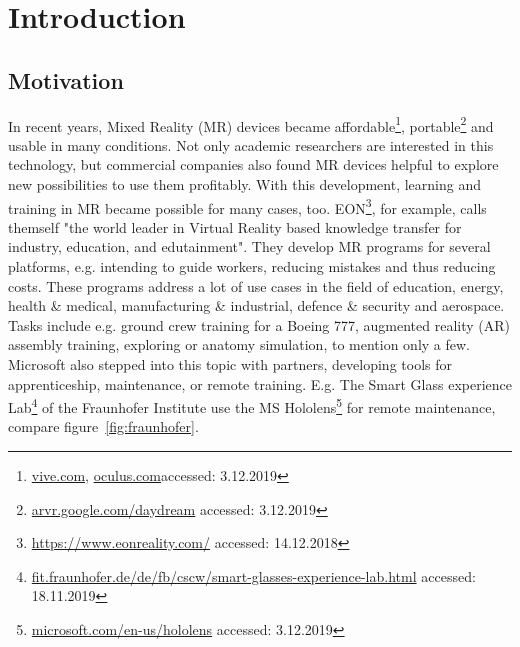 \chapter{Introduction}

\section{Motivation}

In recent years, Mixed Reality (MR) devices became affordable\footnote{\hyperlink{https://www.vive.com/}{vive.com}, \hyperlink{https://www.oculus.com/}{oculus.com}accessed: 3.12.2019}, portable\footnote{\hyperlink{https://arvr.google.com/daydream/}{arvr.google.com/daydream} accessed: 3.12.2019} and usable in many conditions. Not only academic researchers are interested in this technology, but commercial companies also found MR devices helpful to explore new possibilities to use them profitably. With this development, learning and training in MR became possible for many cases, too. EON\footnote{\hyperlink{https://www.eonreality.com/}{https://www.eonreality.com/} accessed: 14.12.2018}, for example, calls themself "the world leader in Virtual Reality based knowledge transfer for industry, education, and edutainment". They develop MR programs for several platforms, e.g. intending to guide workers, reducing mistakes and thus reducing costs. These programs address a lot of use cases in the field of education, energy, health \& medical, manufacturing \& industrial, defence \& security and aerospace. Tasks include e.g. ground crew training for a Boeing 777, augmented reality (AR) assembly training, exploring or anatomy simulation, to mention only a few.\\
Microsoft also stepped into this topic with partners, developing tools for apprenticeship, maintenance, or remote training. E.g. The Smart Glass experience Lab\footnote{\hyperlink{https://www.fit.fraunhofer.de/de/fb/cscw/smart-glasses-experience-lab.html}{fit.fraunhofer.de/de/fb/cscw/smart-glasses-experience-lab.html} accessed: 18.11.2019} of the Fraunhofer Institute use the MS Hololens\footnote{\hyperlink{https://www.microsoft.com/en-us/hololens}{microsoft.com/en-us/hololens} accessed: 3.12.2019} for remote maintenance, compare figure~\ref{fig:fraunhofer}.
